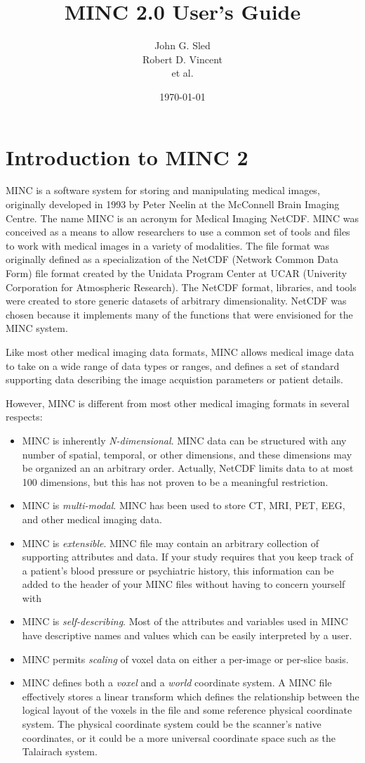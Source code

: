 \documentclass{article}
\title{MINC 2.0 User's Guide}
\author{John G. Sled \\
Robert D. Vincent \\
et al.}
\date{\today}
\begin{document}
\maketitle
\newpage
\tableofcontents
\newpage
\section{Introduction to MINC 2}
MINC is a software system for storing and manipulating medical images,
originally developed in 1993 by Peter Neelin at the McConnell Brain
Imaging Centre.  The name MINC is an acronym for Medical Imaging
NetCDF.  MINC was conceived as a means to allow researchers to use a
common set of tools and files to work with medical images in a variety
of modalities.  The file format was originally defined as a
specialization of the NetCDF (Network Common Data Form) file format
created by the Unidata Program Center at UCAR (Univerity Corporation
for Atmospheric Research).  The NetCDF format, libraries, and tools
were created to store generic datasets of arbitrary dimensionality.
NetCDF was chosen because it implements many of the functions that
were envisioned for the MINC system.

Like most other medical imaging data formats, MINC allows medical
image data to take on a wide range of data types or ranges, and
defines a set of standard supporting data describing the image
acquistion parameters or patient details.

However, MINC is different from most other medical imaging formats in
several respects:
\begin{itemize}
\item MINC is inherently {\it N-dimensional}.  MINC data can be
structured with any number of spatial, temporal, or other dimensions,
and these dimensions may be organized an an arbitrary order.
Actually, NetCDF limits data to at most 100 dimensions, but
this has not proven to be a meaningful restriction.
\item MINC is {\it multi-modal}.  MINC has been used to store CT, MRI,
PET, EEG, and other medical imaging data.
\item MINC is {\it extensible}.  MINC file may contain an arbitrary
collection of supporting attributes and data.  If your study requires
that you keep track of a patient's blood pressure or psychiatric
history, this information can be added to the header of your MINC
files without having to concern yourself with
\item MINC is {\it self-describing}.  Most of the attributes and
variables used in MINC have descriptive names and values which can be
easily interpreted by a user.
\item MINC permits {\it scaling} of voxel data on either a per-image or
per-slice basis.
\item MINC defines both a {\it voxel} and a {\it world} coordinate system.  
A MINC file effectively stores a linear transform which defines the 
relationship between the logical layout of the voxels in the file and 
some reference physical coordinate system.  The physical coordinate
system could be the scanner's native coordinates, or it could be a
more universal coordinate space such as the Talairach system.
\end{itemize}
\end{document}
